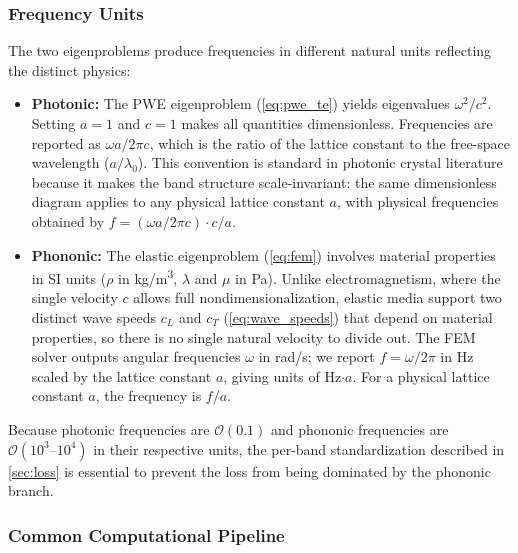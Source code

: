 \documentclass[11pt]{article}
\begin{document}
\subsubsection{Frequency Units}

The two eigenproblems produce frequencies in different natural units reflecting the distinct physics:

\begin{itemize}
    \item \textbf{Photonic:} The PWE eigenproblem (\cref{eq:pwe_te}) yields eigenvalues $\omega^2/c^2$. Setting $a = 1$ and $c = 1$ makes all quantities dimensionless. Frequencies are reported as $\omega a / 2\pi c$, which is the ratio of the lattice constant to the free-space wavelength ($a/\lambda_0$). This convention is standard in photonic crystal literature~\cite{joannopoulos2008} because it makes the band structure scale-invariant: the same dimensionless diagram applies to any physical lattice constant $a$, with physical frequencies obtained by $f = (\omega a / 2\pi c) \cdot c / a$.

    \item \textbf{Phononic:} The elastic eigenproblem (\cref{eq:fem}) involves material properties in SI units ($\rho$ in \si{kg/m^3}, $\lambda$ and $\mu$ in \si{Pa}). Unlike electromagnetism, where the single velocity $c$ allows full nondimensionalization, elastic media support two distinct wave speeds $c_L$ and $c_T$ (\cref{eq:wave_speeds}) that depend on material properties, so there is no single natural velocity to divide out. The FEM solver outputs angular frequencies $\omega$ in \si{rad/s}; we report $f = \omega/2\pi$ in \si{Hz} scaled by the lattice constant $a$, giving units of Hz$\cdot a$. For a physical lattice constant $a$, the frequency is $f/a$.
\end{itemize}

Because photonic frequencies are $\mathcal{O}(0.1)$ and phononic frequencies are $\mathcal{O}(10^3\text{--}10^4)$ in their respective units, the per-band standardization described in \cref{sec:loss} is essential to prevent the loss from being dominated by the phononic branch.

\subsubsection{Common Computational Pipeline}
\end{document}
